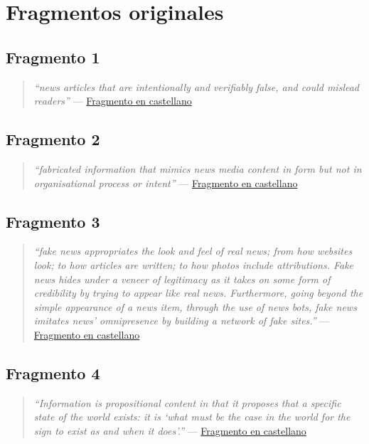 \section{Fragmentos originales}
\subsection{Fragmento 1}
\label{frag1eng}
\begin{quotation}
    \emph{``news articles that are intentionally and verifiably false, and could mislead readers''} --- \hyperref[frag1esp]{Fragmento en castellano}
\end{quotation}

\subsection{Fragmento 2}
\label{frag2eng}
\begin{quotation}
    \emph{``fabricated information that mimics news media content in form but not in organisational process or intent''} --- \hyperref[frag2esp]{Fragmento en castellano}
\end{quotation}

\subsection{Fragmento 3}
\label{frag3eng}
\begin{quotation}
    \emph{``fake news appropriates the look and feel of real news; from how websites look; to how articles are written; to how photos include attributions. Fake news hides under a veneer of legitimacy as it takes on some form of credibility by trying to appear like real news. Furthermore, going beyond the simple appearance of a news item, through the use of news bots, fake news imitates news’ omnipresence by building a network of fake sites.''} --- \hyperref[frag3esp]{Fragmento en castellano}
\end{quotation}

\subsection{Fragmento 4}
\label{frag4eng}
\begin{quotation}
    \emph{``Information is propositional content in that it proposes that a specific state of the world exists: it is `what must be the case in the world for the sign to exist as and when it does'.''} --- \hyperref[frag4esp]{Fragmento en castellano}
\end{quotation}

